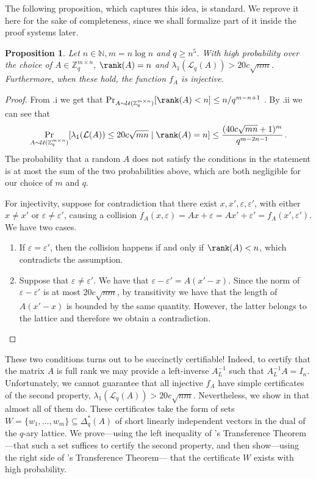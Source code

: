 \documentclass[11pt]{article}
\theoremstyle{definition}
\theoremstyle{plain}
\newtheorem{proposition}[definition]{Proposition}
\theoremstyle{remark}
\newcommand{\LL}{\mathcal{L}}
\newcommand{\bZ}{\mathbb{Z}}
\begin{document}
The following proposition, which captures this idea, is standard. We reprove it here for the sake of completeness, since we shall formalize part of it inside the proof systems later.

\begin{proposition}
\label{prop:injectivity-everywhere}
    Let $n \in \mathbb{N}, m = n\log n$ and $q \geq n^{5}$. With high probability over the choice of $A \in \bZ^{m\times n}_q$, $\rank(A) = n$ and $\lambda_1(\LL_q(A)) > 20c\sqrt{nm}$. Furthermore, when these hold, the function $f_A$ is injective.
\end{proposition}

\begin{proof}
From .i we get that $\Pr_{A\sim \mathcal{U}(\bZ_q^{m \times n}) }[\rank(A) < n] \leq {n}/{q^{m-n+1}}$ . By .ii we can see that
        \[ \Pr_{A\sim \mathcal{U}(\bZ_q^{m \times n})}[\lambda_1(\LL(A)) \leq 20c\sqrt{mn} \mid \rank(A) = n] \leq \frac{(40c\sqrt{mn}+1)^m}{q^{m-2n-1}}\,. \]
The probability that a random $A$ does not satisfy the conditions in the statement is at most the sum of the two probabilities above, which are both negligible for our choice of $m$ and $q$.

For injectivity, suppose for contradiction that there exist $x,x',\varepsilon,\varepsilon'$, with either $x \neq x'$ or $\varepsilon \neq \varepsilon'$, causing a collision $f_A(x, \varepsilon) = Ax+\varepsilon = Ax' + \varepsilon' = f_A(x', \varepsilon')$. We have two cases.
    \begin{enumerate}
        \item[(a)] If $\varepsilon=\varepsilon'$, then the collision happens if and only if $\rank(A) < n$, which contradicts the assumption.
        
        \item[(b)] Suppose that $\varepsilon\neq\varepsilon'$. We have that $\varepsilon-\varepsilon' = A(x'-x)$. Since the norm of $\varepsilon-\varepsilon'$ is at most $20c\sqrt{nm}$, by transitivity we have that the length of $A(x'-x)$ is bounded by the same quantity. However, the latter belongs to the lattice and therefore we obtain a contradiction.  
        \qedhere
    \end{enumerate}
\end{proof}


These two conditions turns out to be succinctly certifiable! Indeed, to certify that the matrix $A$ is full rank we may provide a left-inverse $A^{-1}_L$ such that $A^{-1}_LA = I_n$. Unfortunately, we cannot guarantee that all injective $f_A$ have simple certificates of the second property, $\lambda_1(\LL_q(A)) > 20c\sqrt{nm}$. Nevertheless, we show in  that almost all of them do. These certificates take the form of sets $W = \{ w_1, \dots, w_m\} \subseteq \Delta_q^*(A)$ of short linearly independent vectors in the dual of the $q$-ary lattice. We prove---using the left inequality of \citeauthor{banaszczyk1993new}'s Transference Theorem---that such a set suffices to certify the second property, and then show---using the right side of \citeauthor{banaszczyk1993new}'s Transference Theorem--- that the certificate $W$ exists with high probability.
\end{document}
